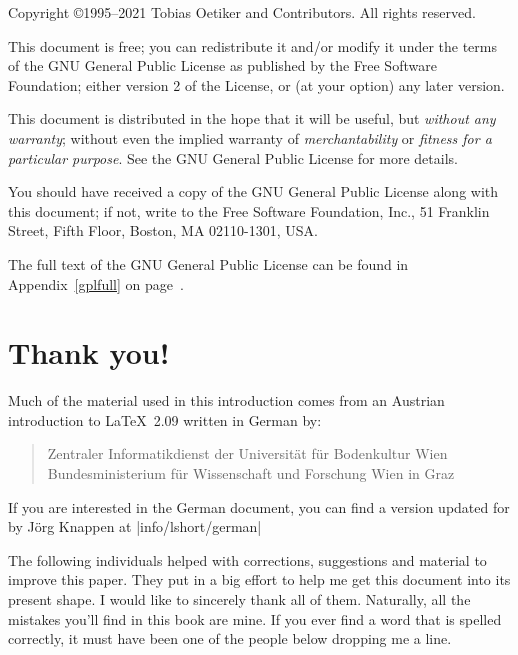 \begin{small}
  \noindent Copyright \copyright{}1995--2021 Tobias Oetiker and Contributors.  All rights reserved.

  This document is free; you can redistribute it and/or modify it
  under the terms of the GNU General Public License as published by
  the Free Software Foundation; either version 2 of the License, or
  (at your option) any later version.

  This document is distributed in the hope that it will be useful, but
  \emph{without any warranty}; without even the implied warranty of
  \emph{merchantability} or \emph{fitness for a particular purpose}\@.  See the GNU
  General Public License for more details.

  You should have received a copy of the GNU General Public License
  along with this document; if not, write to the Free Software
  Foundation, Inc., 51 Franklin Street, Fifth Floor, Boston, MA 02110-1301, %
  USA\@.

  \noindent The full text of the GNU General Public License can be found in Appendix~\ref{gplfull} on page~\pageref{gplfull}.
\end{small}

\chapter{Thank you!}
\noindent Much of the material used in this introduction comes from an
Austrian introduction to \LaTeX\ 2.09 written in German by:
\begin{verse}
  {Zentraler Informatikdienst der Universit\"at f\"ur Bodenkultur Wien}
  {Bundesministerium f\"ur Wissenschaft und Forschung Wien}
  {in Graz}
\end{verse}

If you are interested in the German document, you can find a version
updated for \LaTeXe{} by J\"org Knappen at
\CTAN|info/lshort/german|

\newpage \noindent The
following individuals helped with corrections, suggestions and
material to improve this paper. They put in a big effort to help me
get this document into its present shape. I would like to
sincerely thank all of them. Naturally, all the mistakes you'll find
in this book are mine. If you ever find a word that is spelled
correctly, it must have been one of the people below dropping me a
line.

